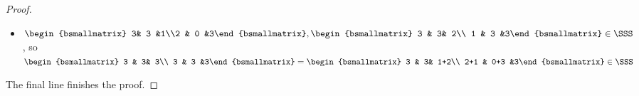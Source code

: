 \documentclass[11pt]{article}
\theoremstyle{definition}
\theoremstyle{remark}
\begin{document}
\begin{proof}
\begin{itemize}
\item $\begin{bsmallmatrix} 3& 3 &1\\2 & 0 &3\end{bsmallmatrix}, \begin{bsmallmatrix} 3 & 3& 2\\ 1 & 3 &3\end{bsmallmatrix}\in \SSS$, so
$\begin{bsmallmatrix} 3 & 3& 3\\ 3 & 3 &3\end{bsmallmatrix}=\begin{bsmallmatrix} 3 & 3& 1+2\\ 2+1 & 0+3 &3\end{bsmallmatrix}\in \SSS$
\end{itemize}
The final line finishes the proof.
\end{proof}
\end{document}
